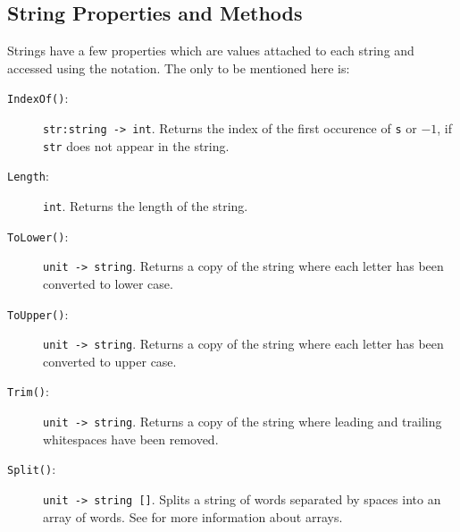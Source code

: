 \subsection{String Properties and Methods}
Strings have a few properties which are values attached to each string and accessed using the  notation. The only to be mentioned here is:
\begin{description}
\item[\texttt{IndexOf()}:] \lstinline{str:string -> int}. Returns the index of the first occurence of \lstinline{s} or $-1$, if \lstinline{str} does not appear in the string.
\item[\texttt{Length}:] \lstinline{int}. Returns the length of the string.
\item[\texttt{ToLower()}:] \lstinline{unit -> string}. Returns a copy of the string where each letter has been converted to lower case.
\item[\texttt{ToUpper()}:] \lstinline{unit -> string}. Returns a copy of the string where each letter has been converted to upper case.
\item[\texttt{Trim()}:] \lstinline{unit -> string}. Returns a copy of the string where leading and trailing whitespaces have been removed.
\item[\texttt{Split()}:] \lstinline{unit -> string []}. Splits a string of words separated by spaces into an array of words. See  for more information about arrays.
\end{description}

